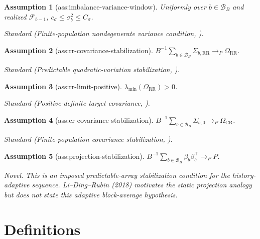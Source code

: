 \documentclass{article}
\newtheorem{assumption}{Assumption}
\begin{document}
\begin{assumption}[ass:imbalance-variance-window]\label{ass:imbalance-variance-window}
Uniformly over \(b\in\mathcal B_B\) and realized \(\mathcal F_{b-1}\), \(c_\sigma\leq\sigma_b^2\leq C_\sigma\).
\par\smallskip\noindent\emph{Standard} (Finite-population nondegenerate variance condition, \cite{LiDing2017FPCLT}).
\end{assumption}

\begin{assumption}[ass:rr-covariance-stabilization]\label{ass:rr-covariance-stabilization}
\(B^{-1}\sum_{b\in\mathcal B_B}\Sigma_{b,\mathrm{RR}}\to_P\Omega_{\mathrm{RR}}\).
\par\smallskip\noindent\emph{Standard} (Predictable quadratic-variation stabilization, \cite{LiZhao2026Adaptive}).
\end{assumption}

\begin{assumption}[ass:rr-limit-positive]\label{ass:rr-limit-positive}
\(\lambda_{\min}(\Omega_{\mathrm{RR}})>0\).
\par\smallskip\noindent\emph{Standard} (Positive-definite target covariance, \cite{LiZhao2026Adaptive}).
\end{assumption}

\begin{assumption}[ass:cr-covariance-stabilization]\label{ass:cr-covariance-stabilization}
\(B^{-1}\sum_{b\in\mathcal B_B}\Sigma_{b,0}\to_P\Omega_{\mathrm{CR}}\).
\par\smallskip\noindent\emph{Standard} (Finite-population covariance stabilization, \cite{LiDingRubin2018}).
\end{assumption}

\begin{assumption}[ass:projection-stabilization]\label{ass:projection-stabilization}
\(B^{-1}\sum_{b\in\mathcal B_B}\beta_b\beta_b^\top\to_P P\).
\par\smallskip\noindent\emph{Novel.} This is an imposed predictable-array stabilization condition for the history-adaptive sequence. Li--Ding--Rubin (2018) motivates the static projection analogy but does not state this adaptive block-average hypothesis.
\end{assumption}

\section{Definitions}
\end{document}

